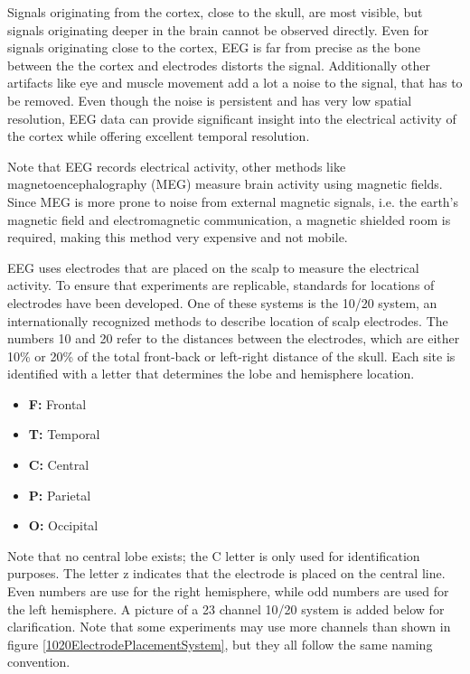 \npar

Signals originating from the cortex, close to the skull, are most visible, but signals originating deeper in the brain cannot be observed directly. Even for signals originating close to the cortex, EEG is far from precise as the bone between the the cortex and electrodes distorts the signal. Additionally other artifacts like eye and muscle movement add a lot a noise to the signal, that has to be removed. Even though the noise is persistent and has very low spatial resolution, EEG data can provide significant insight into the electrical activity of the cortex while offering excellent temporal resolution\cite{GivenPaper}.

\npar

Note that EEG records electrical activity, other methods like magnetoencephalography (MEG) measure brain activity using magnetic fields. Since MEG is more prone to noise from external magnetic signals, i.e. the earth's magnetic field and electromagnetic communication, a magnetic shielded room is required, making this method very expensive and not mobile. 

EEG uses electrodes that are placed on the scalp to measure the electrical activity. To ensure that experiments are replicable, standards for locations of electrodes have been developed. One of these systems is the 10/20 system, an internationally recognized methods to describe location of scalp electrodes\cite{TenTwentyManual}. The numbers 10 and 20 refer to the distances between the electrodes, which are either 10\% or 20\% of the total front-back or left-right distance of the skull. Each site is identified with a letter that determines the lobe and hemisphere location.
\begin{itemize}
\item \textbf{F:} Frontal
\item \textbf{T:} Temporal
\item \textbf{C:} Central
\item \textbf{P:} Parietal
\item \textbf{O:} Occipital
\end{itemize}
Note that no central lobe exists; the C letter is only used for identification purposes. The letter z indicates that the electrode is placed on the central line. Even numbers are use for the right hemisphere, while odd numbers are used for the left hemisphere. A picture of a 23 channel 10/20 system is added below for clarification. Note that some experiments may use more channels than shown in figure \ref{1020ElectrodePlacementSystem}, but they all follow the same naming convention.

